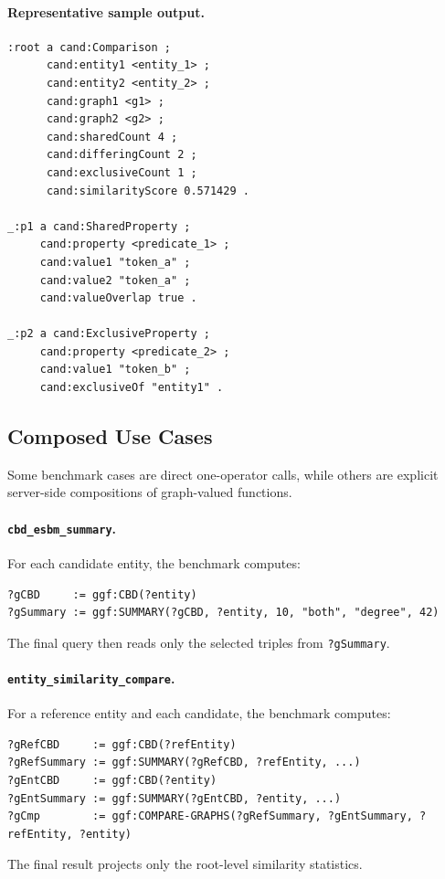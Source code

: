 \paragraph{Representative sample output.}
\begin{verbatim}
:root a cand:Comparison ;
      cand:entity1 <entity_1> ;
      cand:entity2 <entity_2> ;
      cand:graph1 <g1> ;
      cand:graph2 <g2> ;
      cand:sharedCount 4 ;
      cand:differingCount 2 ;
      cand:exclusiveCount 1 ;
      cand:similarityScore 0.571429 .

_:p1 a cand:SharedProperty ;
     cand:property <predicate_1> ;
     cand:value1 "token_a" ;
     cand:value2 "token_a" ;
     cand:valueOverlap true .

_:p2 a cand:ExclusiveProperty ;
     cand:property <predicate_2> ;
     cand:value1 "token_b" ;
     cand:exclusiveOf "entity1" .
\end{verbatim}

\subsection{Composed Use Cases}
\label{subsec:ggf-composed-use-cases}

Some benchmark cases are direct one-operator calls, while others are explicit
server-side compositions of graph-valued functions.

\paragraph{\texttt{cbd\_esbm\_summary}.}
For each candidate entity, the benchmark computes:
\begin{verbatim}
?gCBD     := ggf:CBD(?entity)
?gSummary := ggf:SUMMARY(?gCBD, ?entity, 10, "both", "degree", 42)
\end{verbatim}
The final query then reads only the selected triples from \texttt{?gSummary}.

\paragraph{\texttt{entity\_similarity\_compare}.}
For a reference entity and each candidate, the benchmark computes:
\begin{verbatim}
?gRefCBD     := ggf:CBD(?refEntity)
?gRefSummary := ggf:SUMMARY(?gRefCBD, ?refEntity, ...)
?gEntCBD     := ggf:CBD(?entity)
?gEntSummary := ggf:SUMMARY(?gEntCBD, ?entity, ...)
?gCmp        := ggf:COMPARE-GRAPHS(?gRefSummary, ?gEntSummary, ?refEntity, ?entity)
\end{verbatim}
The final result projects only the root-level similarity statistics.

